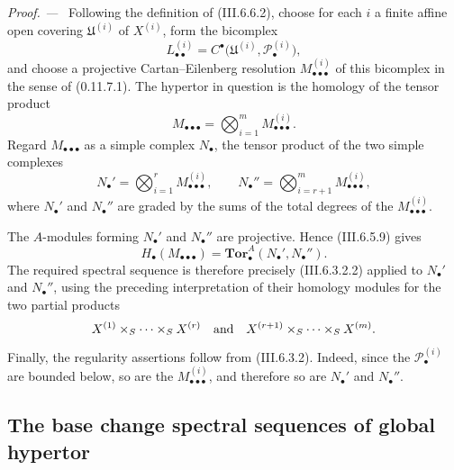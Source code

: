 \documentclass[10pt,oneside]{book}
\newcommand{\sh}[1]{\mathscr{#1}}
\newcommand{\sref}[2][]{(#2)}
\newcommand{\oldpage}[2][]{\setcounter{footnote}{0}\marginpar{\scriptsize\textbf{#1}~|~#2}\ignorespaces}
\newenvironment{proof}{\par\medskip\noindent\textit{Proof. ---\ }}{\par}
\begin{document}
\begin{proof}
Following the definition of \sref{III.6.6.2}, choose for each $i$
a finite affine open covering $\mathfrak U^{(i)}$ of $X^{(i)}$,
form the bicomplex
\[
  L_{\bullet\bullet}^{(i)}
  =
  C^\bullet
  \bigl(
    \mathfrak U^{(i)},\sh P_\bullet^{(i)}
  \bigr),
\]
and choose a projective Cartan--Eilenberg resolution
$M_{\bullet\bullet\bullet}^{(i)}$ of this bicomplex in the sense
of \sref[0]{0.11.7.1}.  The hypertor in question is the homology
of the tensor product
\[
  M_{\bullet\bullet\bullet}
  =
  \bigotimes_{i=1}^{m}
  M_{\bullet\bullet\bullet}^{(i)}.
\]
Regard $M_{\bullet\bullet\bullet}$ as a simple complex
$N_\bullet$, the tensor product of the two simple complexes
\[
  N_\bullet'
  =
  \bigotimes_{i=1}^{r}
  M_{\bullet\bullet\bullet}^{(i)},
  \qquad
  N_\bullet''
  =
  \bigotimes_{i=r+1}^{m}
  M_{\bullet\bullet\bullet}^{(i)},
\]
where $N_\bullet'$ and $N_\bullet''$ are graded by the sums of the
total degrees of the $M_{\bullet\bullet\bullet}^{(i)}$.

The $A$-modules forming $N_\bullet'$ and $N_\bullet''$ are
projective.  Hence \sref{III.6.5.9} gives
\[
  H_\bullet(M_{\bullet\bullet\bullet})
  =
  \mathbf{Tor}_\bullet^A(N_\bullet',N_\bullet'').
\]
The required spectral sequence is therefore precisely
\sref{III.6.3.2.2} applied to $N_\bullet'$ and $N_\bullet''$,
using the preceding interpretation of their homology modules for
the two partial products
\[
  X^{(1)}\times_S\cdots\times_SX^{(r)}
  \quad\hbox{and}\quad
  X^{(r+1)}\times_S\cdots\times_SX^{(m)}.
\]
Finally, the regularity assertions follow from
\sref{III.6.3.2}.  Indeed, since the
$\sh P_\bullet^{(i)}$ are bounded below, so are the
$M_{\bullet\bullet\bullet}^{(i)}$, and therefore so are
$N_\bullet'$ and $N_\bullet''$.
\end{proof}

\oldpage[III]{166}
\subsection{The base change spectral sequences of global hypertor}
\label{subsection:III.6.9}
\label{III.6.9}
\end{document}
